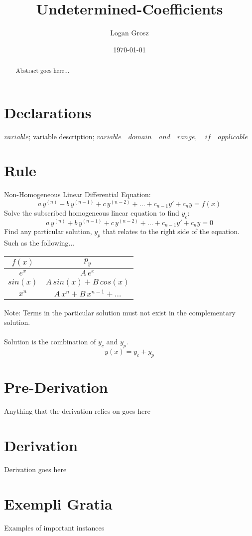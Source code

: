 \documentclass{article}
\begin{document}
	
\author{Logan Grosz}
\title{Undetermined-Coefficients}
\date{\today}

\maketitle

\begin{abstract}
	Abstract goes here...
\end{abstract}

\section{Declarations}

$variable$; variable description; $variable\quad domain\quad and\quad range,\quad if\quad applicable$

\section{Rule}

Non-Homogeneous Linear Differential Equation:
	\begin{equation*}
		a\,y^{(n)}+b\,y^{(n-1)}+c\,y^{(n-2)}+\dots+c_{n-1}y'+c_ny=f(x)
	\end{equation*}
Solve the subscribed homogeneous linear equation to find $y_c$:
	\begin{equation*}
		a\,y^{(n)}+b\,y^{(n-1)}+c\,y^{(n-2)}+\dots+c_{n-1}y'+c_ny=0
	\end{equation*}
Find any particular solution, $y_p$ that relates to the right side of the equation. Such as the following...
	\begin{center}
		\begin{tabular}{cc}
			$f(x)$&$p_y$\\
			\hline
			$e^x$&$A\,e^x$\\
			$sin(x)$&$A\,sin(x)+B\,cos(x)$\\
			$x^n$&$A\,x^n+B\,x^{n-1}+\dots$\\
		\end{tabular}
	\end{center}
Note: Terms in the particular solution must not exist in the complementary solution.\\\\
\noindent Solution is the combination of $y_c$ and $y_p$.
	\begin{equation*}
		y(x)=y_c+y_p
	\end{equation*}
\section{Pre-Derivation}
Anything that the derivation relies on goes here

\section{Derivation}

Derivation goes here

\section{Exempli Gratia}

Examples of important instances
\end{document}
